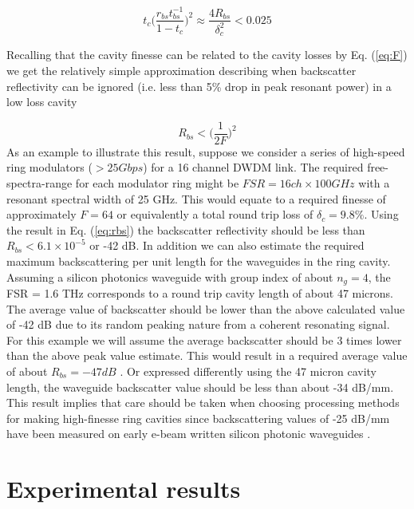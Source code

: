 \documentclass[10pt]{article}
\begin{document}
\begin{equation}
t_c \Big(\frac{r_{bs} t_{bs}^{-1}}{1-t_c}\Big)^2  \approx \frac{4 R_{bs}}{\delta_c^2} < 0.025  
\end{equation}

\noindent
Recalling that the cavity finesse can be related to the cavity losses by Eq. (\ref{eq:F}) we get the relatively simple approximation describing  when backscatter reflectivity can be ignored (i.e. less than 5\% drop in peak resonant power) in a low loss cavity

\begin{equation}
R_{bs} < \Big(\frac{1}{2F}\Big)^2
\label{eq:rbs}
\end{equation}
\noindent
As an example to illustrate this result, suppose we consider a series of high-speed ring modulators ($ > 25  Gbps$) for a 16 channel DWDM link.  The required free-spectra-range for each modulator ring might be $ FSR = 16ch \times{100GHz}$ with a resonant spectral width of 25 GHz.  This would equate to a required finesse of approximately  $ F = 64 $   or equivalently a total round trip loss of $ \delta_c = 9.8\% $.  Using the result in Eq. (\ref{eq:rbs}) the backscatter reflectivity should be less than $ R_{bs} < 6.1 \times 10^{-5}  $ or -42 dB.  In addition we can also estimate the required maximum backscattering per unit length for the waveguides in the ring cavity. Assuming a silicon photonics waveguide with group index of about $n_g=4$, the FSR = 1.6 THz corresponds to a round trip cavity length of about 47 microns. The average value of backscatter should be lower than the above calculated value of -42 dB due to its  random peaking nature from a coherent resonating signal.   For this example we will assume the average backscatter should be 3 times lower than the above peak value estimate.  This would result in a required average value of about $ R_{bs}  = -47 dB  $ .  Or expressed differently using the 47 micron cavity length, the waveguide backscatter value should be less than about -34 dB/mm.  This result implies that care should be taken when choosing processing methods for making high-finesse ring cavities since backscattering values of -25 dB/mm have been measured on early e-beam written silicon photonic waveguides \cite{Melati2014a}. 



\section{Experimental results}
\end{document}
